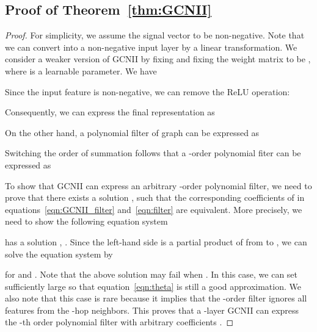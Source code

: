 \documentclass{article}
\begin{document}
\subsection{Proof of Theorem~\ref{thm:GCNII}}
  \begin{proof}
For simplicity, we assume the signal vector  to be
    non-negative. Note that we can convert   into a
    non-negative input layer  by a linear
    transformation. We consider a weaker version of GCNII by fixing
     and fixing the weight matrix   to be , where  is a
 learnable parameter. We have

   Since the input feature  is
   non-negative, we can remove the ReLU operation:
   
  Consequently, we can express the final representation as

  

                       On the other hand,  a polynomial filter of graph
                        can be expressed as
                       
                       Switching the order of summation  follows
                       that a -order polynomial fiter  can be
  expressed as 
  

                      To  show that GCNII can express an arbitrary  -order polynomial filter,  we need to prove that
                         there exists a solution ,
                          such that the
                         corresponding coefficients  of  in equations~\eqref{eqn:GCNII_filter}
                       and~\eqref{eqn:filter} are equivalent. More
                       precisely, we need to show the
                         following equation system 
                         
                         has a solution ,
                         . Since the left-hand
                         side is a partial product of  from
                          to , we can solve the
                         equation system by 
                         
                         for  and .
Note that the above solution may fail when . In this case, we can set
                          sufficiently large so that
                         equation~\eqref{eqn:theta} is still a good
                         approximation.   We also note that this case is rare because it implies
                         that the -order filter ignores all
                         features from the -hop neighbors.      This
       proves that a -layer GCNII  can express  the -th order polynomial filter  with arbitrary
  coefficients . 
 \end{proof}                        
\end{document}
